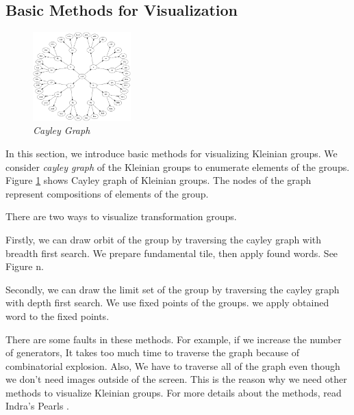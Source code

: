 
\subsection{Basic Methods for Visualization}

\begin{figure}[htbp]
  \center
  \includegraphics[height=1.35in, keepaspectratio]{img/cayleyGraph.png}
  \caption{\textit{Cayley Graph}}
  \label{fig:cayleyGraph}
 \hspace*{\fill}
\end{figure}

In this section, we introduce basic methods for visualizing Kleinian groups.
We consider \textit{cayley graph} of the Kleinian groups to enumerate elements
of the groups.
Figure \ref{fig:cayleyGraph} shows Cayley graph of Kleinian groups. The nodes of the graph
represent compositions of elements of the group.

There are two ways to visualize transformation groups.

Firstly, we can draw orbit of the group by traversing the cayley graph with
breadth first search.
We prepare fundamental tile, then apply found words.
See Figure n.

Secondly, we can draw the limit set of the group by traversing the
cayley graph with depth first search.
We use fixed points of the groups.
we apply obtained word to the fixed points.

There are some faults in these methods.
For example, if we increase the number of generators,
It takes too much time to traverse the graph because of
combinatorial explosion.
Also, We have to traverse all of the graph
even though we don't need images outside of the screen.
This is the reason why we need other methods to visualize Kleinian
groups.
For more details about the methods, read Indra's Pearls .

